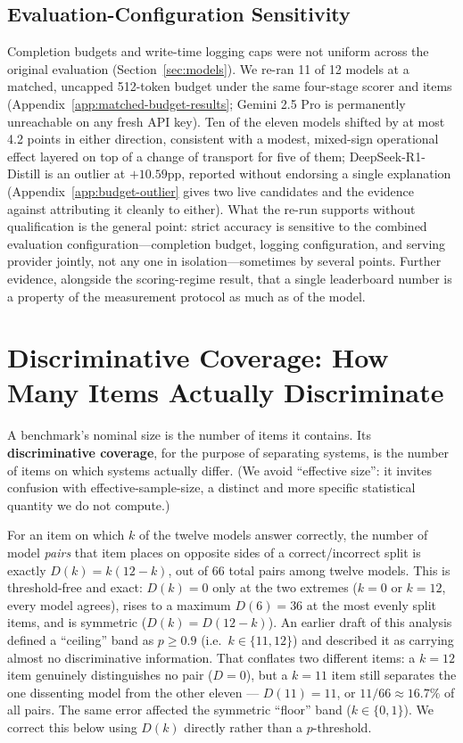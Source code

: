 \subsection{Evaluation-Configuration Sensitivity}
\label{sec:budget-results}

Completion budgets and write-time logging caps were not uniform across the original evaluation
(Section~\ref{sec:models}). We re-ran 11 of 12 models at a matched, uncapped 512-token budget under
the same four-stage scorer and items (Appendix~\ref{app:matched-budget-results}; Gemini 2.5 Pro is
permanently unreachable on any fresh API key). Ten of the eleven models shifted by at most 4.2
points in either direction, consistent with a modest, mixed-sign operational effect layered on top
of a change of transport for five of them; DeepSeek-R1-Distill is an outlier at $+10.59$pp, reported
without endorsing a single explanation (Appendix~\ref{app:budget-outlier} gives two live candidates
and the evidence against attributing it cleanly to either). What the re-run supports without
qualification is the general point: strict accuracy is sensitive to the combined evaluation
configuration---completion budget, logging configuration, and serving provider jointly, not any one
in isolation---sometimes by several points. Further evidence, alongside the scoring-regime result,
that a single leaderboard number is a property of the measurement protocol as much as of the model.

\section{Discriminative Coverage: How Many Items Actually Discriminate}
\label{sec:effsize}

A benchmark's nominal size is the number of items it contains. Its \textbf{discriminative
coverage}, for the purpose of separating systems, is the number of items on which systems actually
differ. (We avoid ``effective size'': it invites confusion with effective-sample-size, a distinct
and more specific statistical quantity we do not compute.)

For an item on which $k$ of the twelve models answer correctly, the number of model \emph{pairs}
that item places on opposite sides of a correct/incorrect split is exactly $D(k) = k(12-k)$, out of
66 total pairs among twelve models. This is threshold-free and exact: $D(k)=0$ only at the two extremes
($k=0$ or $k=12$, every model agrees), rises to a maximum $D(6)=36$ at the most evenly split items,
and is symmetric ($D(k)=D(12-k)$). An earlier draft of this analysis defined a ``ceiling'' band as
$p \ge 0.9$ (i.e.\ $k \in \{11,12\}$) and described it as carrying almost no discriminative
information. That conflates two different items: a $k=12$ item genuinely distinguishes no pair
($D=0$), but a $k=11$ item still separates the one dissenting model from the other eleven ---
$D(11)=11$, or $11/66 \approx 16.7\%$ of all pairs. The same error affected the symmetric ``floor''
band ($k \in \{0,1\}$). We correct this below using $D(k)$ directly rather than a $p$-threshold.

